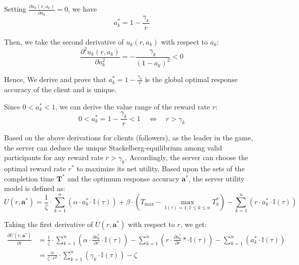 \documentclass[final,1p,times]{elsarticle}
\begin{document}
Setting $\frac{\partial u_k(r,a_k)}{\partial a_k} = 0$, we have
\begin{equation}
	a_k^\ast = 1 - \frac{\gamma_k}{r}
\end{equation}	

Then, we take the second derivative of $u_k(r,a_k)$ with respect to $a_k$:
\begin{equation}
	\frac{\partial^2 u_k(r,a_k)}{\partial a_k^2} = - \frac{\gamma_k}{(1-a_k)^2} < 0
\end{equation}	

Hence, We derive and prove that $a_k^\ast = 1 - \frac{\gamma_k}{r}$ is the global optimal response accuracy of the client and is unique.

Since $0<a_k^\ast<1$, we can derive the value range of the reward rate $r$:
\begin{equation}
	0 < a_k^\ast = 1 - \frac{\gamma_k}{r} < 1\quad
	\Leftrightarrow\quad r > \gamma_k
\end{equation}	

Based on the above derivations for clients (followers), as the leader in the game, the server can deduce the unique Stackelberg-equilibrium among valid participants for any reward rate $r>\gamma_k$. Accordingly, the server can choose the optimal reward rate $r^\ast$ to maximize its net utility. Based upon the sets of the completion time $\bm{T}^\ast$ and the optimum response accuracy $\bm{a}^\ast$, the server utility model is defined as:
\begin{equation}
	U(r,\bm{a}^\ast) = \frac{1}{\zeta}\cdot \sum_{k=1}^n(\alpha\cdot a_k^\ast\cdot \mathbb{I}(\tau)) + \beta\cdot(T_{\max}-\max_{\mathbb{I}(\tau)=1,1\le k\le n}T_k^\ast) - \sum_{k=1}^n(r\cdot a_k^\ast\cdot \mathbb{I}(\tau))
\end{equation}

Taking the first derivative of $U(r,\bm{a}^\ast)$ with respect to $r$, we get:
\begin{equation}
	\begin{aligned}
		\frac{\partial U(r,\bm{a}^\ast)}{\partial r} &= \frac{1}{\zeta}\cdot \sum_{k=1}^n(\alpha\cdot \frac{\partial a_k^\ast}{\partial r}\cdot \mathbb{I}(\tau)) - \sum_{k=1}^n(r\cdot \frac{\partial a_k^\ast}{\partial r}\ast\cdot \mathbb{I}(\tau)) - \sum_{k=1}^n(a_k^\ast\cdot \mathbb{I}(\tau))\\
		&= \frac{\alpha}{\zeta\cdot r^2}\cdot\sum_{k=1}^n(\gamma_k\cdot\mathbb{I}(\tau))-\zeta
	\end{aligned}
\end{equation}
\end{document}
